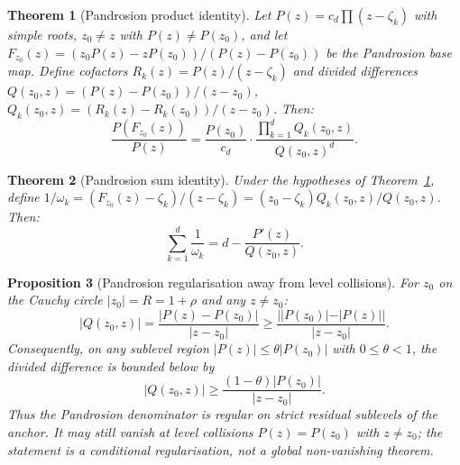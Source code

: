 \documentclass[11pt,a4paper]{article}
\newtheorem{theorem}{Theorem}[section]
\newtheorem{proposition}[theorem]{Proposition}
\begin{document}
\begin{theorem}[Pandrosion product identity]\label{thm:pp-id}
Let $P(z) = c_d \prod (z - \zeta_k)$ with simple roots, $z_0 \ne z$ with $P(z) \ne P(z_0)$, and let $F_{z_0}(z) = (z_0 P(z) - z P(z_0))/(P(z) - P(z_0))$ be the Pandrosion base map. Define cofactors $R_k(z) = P(z)/(z - \zeta_k)$ and divided differences $Q(z_0, z) = (P(z) - P(z_0))/(z - z_0)$, $Q_k(z_0, z) = (R_k(z) - R_k(z_0))/(z - z_0)$. Then:
\begin{equation}
\boxed{\frac{P(F_{z_0}(z))}{P(z)} = \frac{P(z_0)}{c_d} \cdot \frac{\prod_{k=1}^d Q_k(z_0, z)}{Q(z_0, z)^d}.}
\end{equation}
\end{theorem}

\begin{theorem}[Pandrosion sum identity]\label{thm:ps-id}
Under the hypotheses of Theorem~\ref{thm:pp-id}, define $1/\omega_k = (F_{z_0}(z) - \zeta_k)/(z - \zeta_k) = (z_0 - \zeta_k) Q_k(z_0, z) / Q(z_0, z)$. Then:
\begin{equation}
\sum_{k=1}^d \frac{1}{\omega_k} = d - \frac{P'(z)}{Q(z_0, z)}.
\end{equation}
\end{theorem}

\begin{proposition}[Pandrosion regularisation away from level collisions]\label{thm:reg}
For $z_0$ on the Cauchy circle $|z_0| = R = 1 + \rho$ and any $z \ne z_0$:
$$ |Q(z_0, z)| = \frac{|P(z) - P(z_0)|}{|z - z_0|} \ge \frac{||P(z_0)| - |P(z)||}{|z - z_0|}. $$
Consequently, on any sublevel region $|P(z)| \le \theta |P(z_0)|$ with
$0\le\theta<1$, the divided difference is bounded below by
\[
|Q(z_0,z)|\ge \frac{(1-\theta)|P(z_0)|}{|z-z_0|}.
\]
Thus the Pandrosion denominator is regular on strict residual sublevels of the
anchor. It may still vanish at level collisions $P(z)=P(z_0)$ with $z\ne z_0$;
the statement is a conditional regularisation, not a global non-vanishing
theorem.
\end{proposition}
\end{document}
